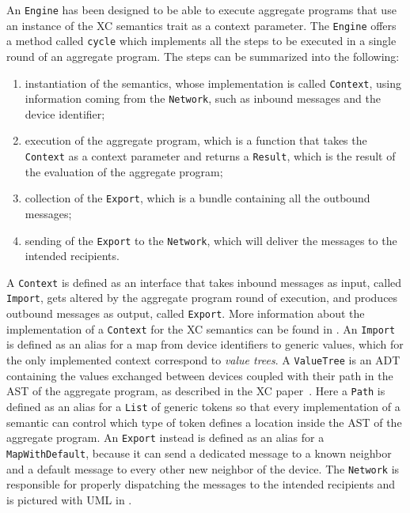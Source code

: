 An \texttt{Engine} has been designed to be able to execute aggregate programs that use an instance of the \ac{XC} semantics trait as a context parameter.
%
The \texttt{Engine} offers a method called \texttt{cycle} which implements all the steps to be executed in a single round of an aggregate program.
%
The steps can be summarized into the following:
\begin{enumerate}
    \item instantiation of the semantics, whose implementation is called \texttt{Context}, using information coming from the \texttt{Network}, such as inbound messages and the device identifier;
    \item execution of the aggregate program, which is a function that takes the \texttt{Context} as a context parameter and returns a \texttt{Result}, which is the result of the evaluation of the aggregate program;
    \item collection of the \texttt{Export}, which is a bundle containing all the outbound messages;
    \item sending of the \texttt{Export} to the \texttt{Network}, which will deliver the messages to the intended recipients.
\end{enumerate}
%
A \texttt{Context} is defined as an interface that takes inbound messages as input, called \texttt{Import}, gets altered by the aggregate program round of execution, and produces outbound messages as output, called \texttt{Export}.
%
More information about the implementation of a \texttt{Context} for the \ac{XC} semantics can be found in .
%
An \texttt{Import} is defined as an alias for a map from device identifiers to generic values, which for the only implemented context correspond to \textit{value trees}.
%
A \texttt{ValueTree} is an \ac{ADT} containing the values exchanged between devices coupled with their path in the \ac{AST} of the aggregate program, as described in the \ac{XC} paper~\cite{xc}.
%
Here a \texttt{Path} is defined as an alias for a \texttt{List} of generic tokens so that every implementation of a semantic can control which type of token defines a location inside the \ac{AST} of the aggregate program.
%
An \texttt{Export} instead is defined as an alias for a \texttt{MapWithDefault}, because it can send a dedicated message to a known neighbor and a default message to every other new neighbor of the device.
%
The \texttt{Network} is responsible for properly dispatching the messages to the intended recipients and is pictured with \ac{UML} in .


